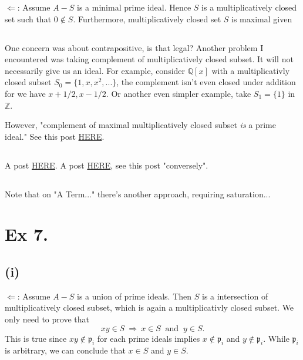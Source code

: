 $\Leftarrow$: Assume $A-S$ is a minimal prime ideal. Hence $S$ is a multiplicatively closed set such that $0\notin S$. Furthermore, multiplicatively closed set $S$ is maximal given

\subsection{}
One concern was about contrapositive, is that legal? Another problem I encountered was taking complement of multiplicatively closed subset. It will not necessarily give us an ideal. For example, consider $\mathbb Q[x]$ with a multiplicativly closed subset $S_0=\{1,x,x^2,...\}$, the complement isn't even closed under addition for we have $x+1/2,x-1/2$. Or another even simpler example, take $S_1=\{1\}$ in $\mathbb Z$.

However, "complement of maximal multiplicatively closed subset \textit{is} a prime ideal." See this post \href{https://math.stackexchange.com/questions/3704318/complement-of-multiplicative-set-is-a-prime-ideal}{HERE}. 

\subsection{}
A post \href{https://math.stackexchange.com/questions/25739/complement-of-maximal-multiplicative-set-is-a-prime-ideal}{HERE}. A post \href{https://math.stackexchange.com/questions/3962023/atiyah-macdonald-exercise-3-6}{HERE}, see this post "conversely". 

\subsection{}

Note that on "A Term..." there's another approach, requiring saturation... 

\section{Ex 7.}\label{Atiyah Chapter 3 Ex 7}

\subsection{(i)}

$\Leftarrow$: Assume $A-S$ is a union of prime ideals. Then $S$ is a intersection of multiplicatively closed subset, which is again a multiplicativly closed subset. We only need to prove that 
$$xy\in S ~\Rightarrow~ x\in S ~\text{ and }~ y\in S.$$
This is true since $xy\notin \mathfrak p_i$ for each prime ideals implies $x\notin\mathfrak p_i$ and $y\notin\mathfrak p_i$. While $\mathfrak p_i$ is arbitrary, we can conclude that $x\in S$ and $y\in S$.

